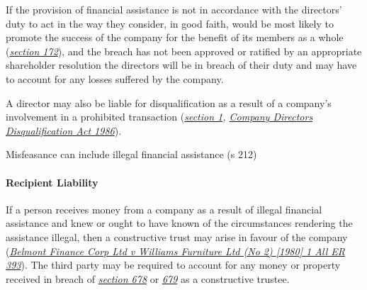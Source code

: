 \documentclass[
]{article}
\newenvironment{Shaded}{}{}
\newcommand{\NormalTok}[1]{#1}
\begin{document}
If the provision of financial assistance is not in accordance with the
directors' duty to act in the way they consider, in good faith, would be
most likely to promote the success of the company for the benefit of its
members as a whole
(\emph{\href{https://uk.westlaw.com/5-505-5377?originationContext=document\&transitionType=PLDocumentLink\&contextData=(sc.Default)\&ppcid=fc9f4d9e83af4b4c8d47bf5847a3205c}{section
172}}), and the breach has not been approved or ratified by an
appropriate shareholder resolution the directors will be in breach of
their duty and may have to account for any losses suffered by the
company.

A director may also be liable for disqualification as a result of a
company's involvement in a prohibited transaction
(\emph{\href{https://uk.westlaw.com/5-506-8501?originationContext=document\&transitionType=PLDocumentLink\&contextData=(sc.Default)\&ppcid=fc9f4d9e83af4b4c8d47bf5847a3205c}{section
1},
\href{https://uk.westlaw.com/4-505-7796?originationContext=document\&transitionType=PLDocumentLink\&contextData=(sc.Default)\&ppcid=fc9f4d9e83af4b4c8d47bf5847a3205c}{Company
Directors Disqualification Act 1986}}).

\begin{Shaded}
\begin{Highlighting}[]
\NormalTok{Misfeasance can include illegal financial assistance (s 212)}
\end{Highlighting}
\end{Shaded}

\hypertarget{recipient-liability}{%
\paragraph{Recipient Liability}\label{recipient-liability}}

If a person receives money from a company as a result of illegal
financial assistance and knew or ought to have known of the
circumstances rendering the assistance illegal, then a constructive
trust may arise in favour of the company
(\emph{\href{https://uk.westlaw.com/D-016-7350?originationContext=document\&transitionType=PLDocumentLink\&contextData=(sc.Default)\&ppcid=fc9f4d9e83af4b4c8d47bf5847a3205c}{Belmont
Finance Corp Ltd v Williams Furniture Ltd (No 2) {[}1980{]} 1 All ER
393}}). The third party may be required to account for any money or
property received in breach of
\emph{\href{https://uk.westlaw.com/5-505-7258?originationContext=document\&transitionType=PLDocumentLink\&contextData=(sc.Default)\&ppcid=fc9f4d9e83af4b4c8d47bf5847a3205c}{section
678}} or
\emph{\href{https://uk.westlaw.com/6-506-2056?originationContext=document\&transitionType=PLDocumentLink\&contextData=(sc.Default)\&ppcid=fc9f4d9e83af4b4c8d47bf5847a3205c}{679}}
as a constructive trustee.
\end{document}
